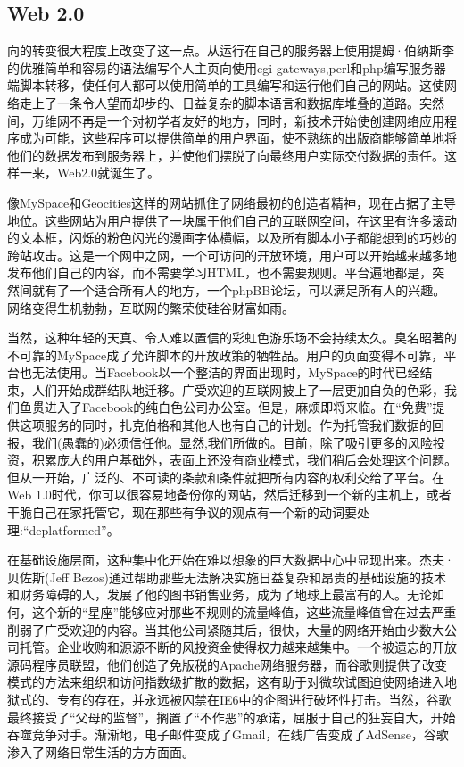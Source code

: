 \subsection{Web 2.0 \statusgreen}\label{sec:web_2}

向的转变很大程度上改变了这一点。从运行在自己的服务器上使用提姆·伯纳斯李的优雅简单和容易的语法编写个人主页向使用cgi-gateways,perl和php编写服务器端脚本转移，使任何人都可以使用简单的工具编写和运行他们自己的网站。这使网络走上了一条令人望而却步的、日益复杂的脚本语言和数据库堆叠的道路。突然间，万维网不再是一个对初学者友好的地方，同时，新技术开始使创建网络应用程序成为可能，这些程序可以提供简单的用户界面，使不熟练的出版商能够简单地将他们的数据发布到服务器上，并使他们摆脱了向最终用户实际交付数据的责任。这样一来，Web2.0就诞生了。

像MySpace和Geocities这样的网站抓住了网络最初的创造者精神，现在占据了主导地位。这些网站为用户提供了一块属于他们自己的互联网空间，在这里有许多滚动的文本框，闪烁的粉色闪光的漫画字体横幅，以及所有脚本小子都能想到的巧妙的跨站攻击。这是一个网中之网，一个可访问的开放环境，用户可以开始越来越多地发布他们自己的内容，而不需要学习HTML，也不需要规则。平台遍地都是，突然间就有了一个适合所有人的地方，一个phpBB论坛，可以满足所有人的兴趣。网络变得生机勃勃，互联网的繁荣使硅谷财富如雨。

当然，这种年轻的天真、令人难以置信的彩虹色游乐场不会持续太久。臭名昭著的不可靠的MySpace成了允许脚本的开放政策的牺牲品。用户的页面变得不可靠，平台也无法使用。当Facebook以一个整洁的界面出现时，MySpace的时代已经结束，人们开始成群结队地迁移。广受欢迎的互联网披上了一层更加自负的色彩，我们鱼贯进入了Facebook的纯白色公司办公室。但是，麻烦即将来临。在“免费”提供这项服务的同时，扎克伯格和其他人也有自己的计划。作为托管我们数据的回报，我们(愚蠢的\cite{carlson2010ims})必须信任他。显然,我们所做的。目前，除了吸引更多的风险投资，积累庞大的用户基础外，表面上还没有商业模式，我们稍后会处理这个问题。但从一开始，广泛的、不可读的条款和条件就把所有内容的权利交给了平台。在Web 1.0时代，你可以很容易地备份你的网站，然后迁移到一个新的主机上，或者干脆自己在家托管它，现在那些有争议的观点有一个新的动词要处理:“deplatformed”。

在基础设施层面，这种集中化开始在难以想象的巨大数据中心中显现出来。杰夫·贝佐斯(Jeff Bezos)通过帮助那些无法解决实施日益复杂和昂贵的基础设施的技术和财务障碍的人，发展了他的图书销售业务，成为了地球上最富有的人。无论如何，这个新的“星座”能够应对那些不规则的流量峰值，这些流量峰值曾在过去严重削弱了广受欢迎的内容。当其他公司紧随其后，很快，大量的网络开始由少数大公司托管。企业收购和源源不断的风投资金使得权力越来越集中。一个被遗忘的开放源码程序员联盟，他们创造了免版税的Apache网络服务器，而谷歌则提供了改变模式的方法来组织和访问指数级扩散的数据，这有助于对微软试图迫使网络进入地狱式的、专有的存在，并永远被囚禁在IE6中的企图进行破坏性打击。当然，谷歌最终接受了“父母的监督”，搁置了“不作恶”的承诺，屈服于自己的狂妄自大，开始吞噬竞争对手。渐渐地，电子邮件变成了Gmail，在线广告变成了AdSense，谷歌渗入了网络日常生活的方方面面。

